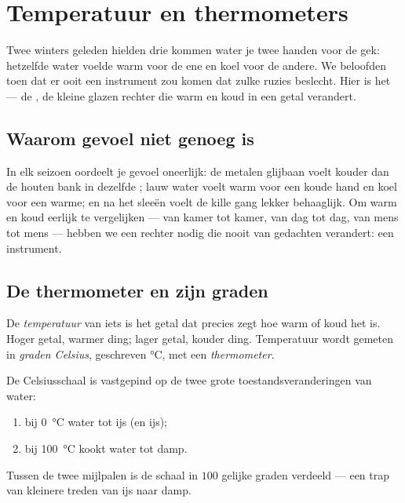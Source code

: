 \chapter{Temperatuur en thermometers}\label{ch:g3:temperature-thermometers}

Twee winters geleden hielden drie kommen water je twee handen voor de
gek: hetzelfde water voelde warm voor de ene en koel voor de andere.
We beloofden toen dat er ooit een instrument zou komen dat zulke
ruzies beslecht. Hier is het --- de , de kleine glazen
rechter die warm en koud in een getal verandert.

\section{Waarom gevoel niet genoeg is}

\begin{example}\label{ex:g3:temperature-thermometers:unfair}
In elk seizoen oordeelt je gevoel oneerlijk: de metalen glijbaan voelt
kouder dan de houten bank in dezelfde ; lauw water voelt warm
voor een koude hand en koel voor een warme; en na het sleeën voelt de
kille gang lekker behaaglijk. Om warm en koud eerlijk te vergelijken
--- van kamer tot kamer, van dag tot dag, van mens tot mens --- hebben
we een rechter nodig die nooit van gedachten verandert: een
instrument.
\end{example}

\section{De thermometer en zijn graden}

\begin{definition}[Temperatuur]\label{def:g3:temperature-thermometers:temperature}
De \emph{temperatuur} van iets is het getal dat
precies zegt hoe warm of koud het is. Hoger getal, warmer ding; lager
getal, kouder ding. Temperatuur wordt gemeten in \emph{graden
Celsius}, geschreven \unit{\celsius}, met een
\emph{thermometer}.
\end{definition}

\begin{proposition}\label{prop:g3:temperature-thermometers:milestones}
De Celsiusschaal is vastgepind op de twee grote
toestandsveranderingen van water:
\begin{enumerate}
  \item bij \qty{0}{\celsius}  water tot ijs (en  ijs);
  \item bij \qty{100}{\celsius} kookt water tot damp.
\end{enumerate}
Tussen de twee mijlpalen is de schaal in $100$ gelijke graden verdeeld
--- een trap van kleinere treden van ijs naar damp.
\end{proposition}

